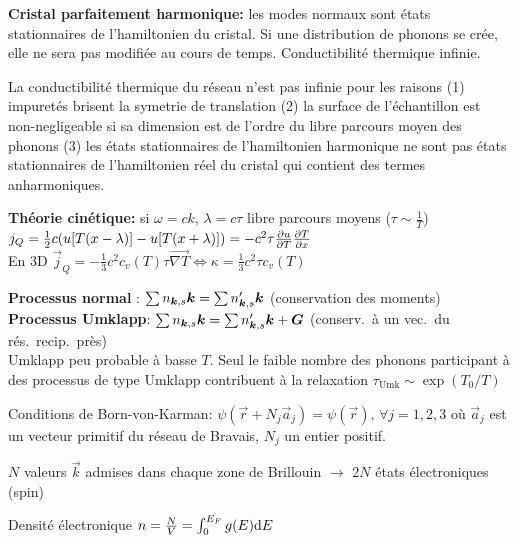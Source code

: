 \begin{squishlist}
    \item \textbf{Cristal parfaitement harmonique:} les modes normaux sont états stationnaires de l'hamiltonien du cristal. Si une distribution de phonons se crée, elle ne sera pas modifiée au cours de temps. Conductibilité thermique infinie.
    \item La conductibilité thermique du réseau n'est pas infinie pour les raisons
    (1) impuretés brisent la symetrie de translation (2) la surface de l'échantillon est non-negligeable si sa dimension est de l'ordre du libre parcours moyen des phonons (3) les états stationnaires de l’hamiltonien harmonique ne sont pas états stationnaires de l’hamiltonien réel du cristal qui contient des termes anharmoniques.
    \item \textbf{Théorie cinétique:} si $\omega = ck$, $\lambda = c \tau$ libre parcours moyens ($\tau \sim \frac{1}{T}$) \\ $j_Q = \frac{1}{2}c (u[T(x-\lambda)] - u[T(x+\lambda)]) = - c^2 \tau \D{T}{u}\D{x}{T}$ \\
    En 3D $\vec{j}_Q = - \frac{1}{3}c^2 c_v(T) \tau \vec{\nabla T} \Longleftrightarrow \kappa = \frac{1}{3} c^2 \tau c_v(T)$
    \item \textbf{Processus normal} : $\sum n_{\vk,s}\vk = \sum n'_{\vk, s}\vk$ (conservation des moments) \\
    \textbf{Processus Umklapp}:  $\sum n_{\vk,s}\vk = \sum n'_{\vk, s}\vk + \vG$ (conserv.\ à un vec.\ du rés.\ recip.\ près) \\
    Umklapp peu probable à basse $T$. Seul le faible nombre des phonons participant à des processus de type Umklapp contribuent à la relaxation $\tau_{\text{Umk}} \sim \exp(T_0/T)$
\end{squishlist}


\begin{squishlist}
    \item Conditions de Born-von-Karman: $\psi(\vec{r} + N_j \vec{a}_j) = \psi(\vec{r}), \, \forall j=1,2,3$ où $\vec{a}_j$ est un vecteur primitif du réseau de Bravais, $N_j$ un entier positif.
    \item $N$ valeurs $\vec{k}$ admises dans chaque zone de Brillouin $\rightarrow$ $2N$ états électroniques (spin)
    \item Densité électronique $n = \frac{N}{V} = \int_0^{E_F} g(E) \ud E$
\end{squishlist}

